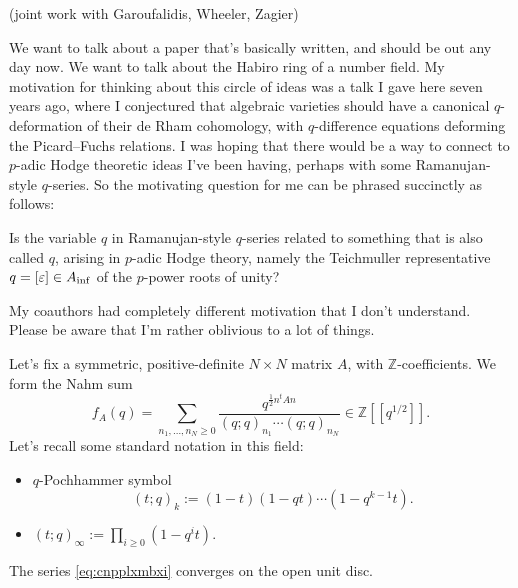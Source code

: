 \documentclass[reqno]{amsart} 
\begin{document}
(joint work with Garoufalidis, Wheeler, Zagier)

We want to talk about a paper that's basically written, and should be out any day now.  We want to talk about the Habiro ring of a number field.  My motivation for thinking about this circle of ideas was a talk I gave here seven years ago, where I conjectured that algebraic varieties should have a canonical $q$-deformation of their de Rham cohomology, with $q$-difference equations deforming the Picard--Fuchs relations.  I was hoping that there would be a way to connect to $p$-adic Hodge theoretic ideas I've been having, perhaps with some Ramanujan-style $q$-series.  So the motivating question for me can be phrased succinctly as follows:
\begin{question}
  Is the variable $q$ in Ramanujan-style $q$-series related to something that is also called $q$, arising in $p$-adic Hodge theory, namely the Teichmuller representative $q =[\varepsilon] \in A_{\inf}$ of the $p$-power roots of unity?
\end{question}
My coauthors had completely different motivation that I don't understand.  Please be aware that I'm rather oblivious to a lot of things.

Let's fix a symmetric, positive-definite $N \times N$ matrix $A$, with $\mathbb{Z}$-coefficients.  We form the Nahm sum
\begin{equation}\label{eq:cnpplxmbxi}
  f_A(q) = \sum_{n_1, \dotsc, n_N \geq 0}
  \frac{  q^{\tfrac{1}{2} n^t A n}}{
    (q ; q)_{n_1} \dotsb(q ; q)_{n_N}
  } \in \mathbb{Z}[[q^{1/2} ]].
\end{equation}
Let's recall some standard notation in this field:
\begin{itemize}
\item $q$-Pochhammer symbol
  \begin{equation*}
    (t ; q)_{k} :=(1 - t)(1 - q t) \dotsb(1 - q^{k - 1} t).
  \end{equation*}
\item $(t; q)_\infty := \prod_{i \geq 0}(1 - q^i t)$.
\end{itemize}
The series \eqref{eq:cnpplxmbxi} converges on the open unit disc.
\end{document}
